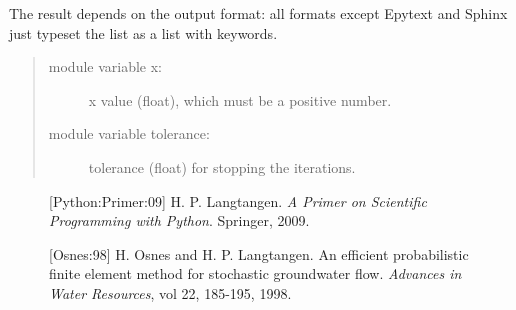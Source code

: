 \documentclass[a4paper,english]{article}
\begin{document}
The result depends on the output format: all formats except Epytext
and Sphinx just typeset the list as a list with keywords.
%
\begin{quote}
%
\begin{description}
\item[{module variable x:}] \leavevmode 
x value (float),
which must be a positive number.

\item[{module variable tolerance:}] \leavevmode 
tolerance (float) for stopping
the iterations.

\end{description}

\end{quote}
\begin{figure}[b][Python:Primer:09]
H. P. Langtangen.
\emph{A Primer on Scientific Programming with Python}.
Springer, 2009.
\end{figure}
\begin{figure}[b][Osnes:98]
H. Osnes and H. P. Langtangen.
An efficient probabilistic finite element method for stochastic
groundwater flow.
\emph{Advances in Water Resources}, vol 22, 185-195, 1998.
\end{figure}
\end{document}
